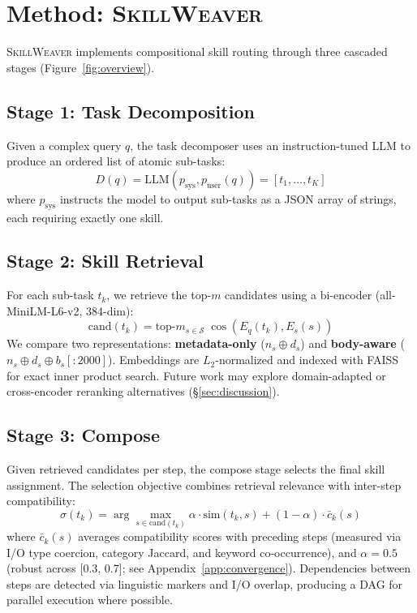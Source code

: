 \documentclass[11pt]{article}
\newcommand{\system}{\textsc{SkillWeaver}}
\begin{document}
\section{Method: \system{}}
\label{sec:method}

\system{} implements compositional skill routing through three cascaded stages (Figure~\ref{fig:overview}).

\subsection{Stage 1: Task Decomposition}

Given a complex query $q$, the task decomposer uses an instruction-tuned LLM to produce an ordered list of atomic sub-tasks:
\begin{equation}
D(q) = \text{LLM}(p_{\text{sys}}, p_{\text{user}}(q)) = [t_1, \ldots, t_K]
\end{equation}
where $p_{\text{sys}}$ instructs the model to output sub-tasks as a JSON array of strings, each requiring exactly one skill.

\subsection{Stage 2: Skill Retrieval}

For each sub-task $t_k$, we retrieve the top-$m$ candidates using a bi-encoder (all-MiniLM-L6-v2, 384-dim):
\begin{equation}
\text{cand}(t_k) = \text{top-}m_{s \in \mathcal{S}} \; \cos(E_q(t_k), E_s(s))
\end{equation}
We compare two representations: \textbf{metadata-only} ($n_s \oplus d_s$) and \textbf{body-aware} ($n_s \oplus d_s \oplus b_s[:2000]$).
Embeddings are $L_2$-normalized and indexed with FAISS~\cite{johnson2019faiss} for exact inner product search.
Future work may explore domain-adapted or cross-encoder reranking alternatives (\S\ref{sec:discussion}).

\subsection{Stage 3: Compose}
\label{sec:compose}

Given retrieved candidates per step, the compose stage selects the final skill assignment.
The selection objective combines retrieval relevance with inter-step compatibility:
\begin{equation}
\sigma(t_k) = \arg\max_{s \in \text{cand}(t_k)} \alpha \!\cdot\! \text{sim}(t_k, s) + (1\!-\!\alpha) \!\cdot\! \bar{c}_k(s)
\label{eq:selection}
\end{equation}
where $\bar{c}_k(s)$ averages compatibility scores with preceding steps (measured via I/O type coercion, category Jaccard, and keyword co-occurrence), and $\alpha = 0.5$ (robust across [0.3, 0.7]; see Appendix~\ref{app:convergence}).
Dependencies between steps are detected via linguistic markers and I/O overlap, producing a DAG for parallel execution where possible.
\end{document}
